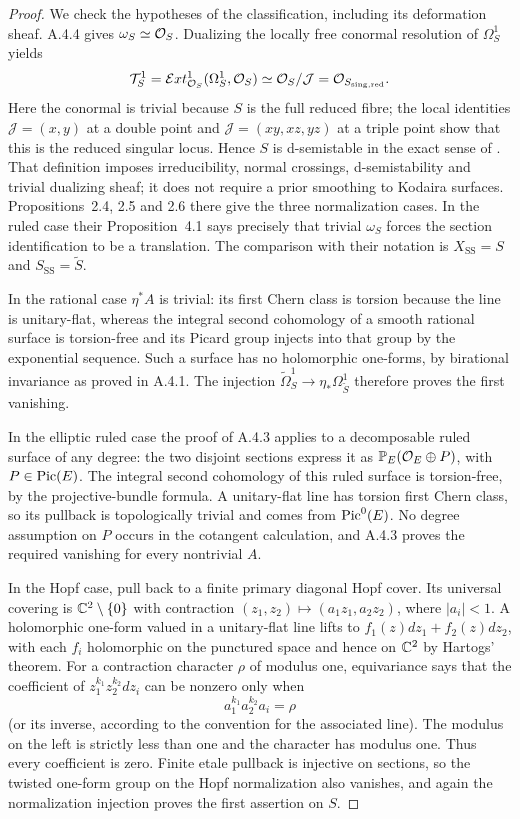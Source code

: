 \begin{proof}
We check the hypotheses of the classification, including its deformation sheaf. A.4.4 gives $\omega_S\simeq\mathcal O_S$. Dualizing the locally free conormal resolution of $\Omega_S^1$ yields
\[
 \mathcal T^1_S=\mathcal Ext^1_{\mathcal O_S}(\Omega_S^1,\mathcal O_S)
 \simeq\mathcal O_S/\mathcal J=\mathcal O_{S_{\rm sing,red}}.
\]
Here the conormal is trivial because $S$ is the full reduced fibre; the local identities $\mathcal J=(x,y)$ at a double point and $\mathcal J=(xy,xz,yz)$ at a triple point show that this is the reduced singular locus. Hence $S$ is d-semistable in the exact sense of \cite[Definition~2.1]{SS2002}. That definition imposes irreducibility, normal crossings, d-semistability and trivial dualizing sheaf; it does not require a prior smoothing to Kodaira surfaces. Propositions~2.4, 2.5 and 2.6 there give the three normalization cases. In the ruled case their Proposition~4.1 says precisely that trivial $\omega_S$ forces the section identification to be a translation. The comparison with their notation is $X_{\mathrm{SS}}=S$ and $S_{\mathrm{SS}}=\widetilde S$.

In the rational case $\eta^*A$ is trivial: its first Chern class is torsion because the line is unitary-flat, whereas the integral second cohomology of a smooth rational surface is torsion-free and its Picard group injects into that group by the exponential sequence. Such a surface has no holomorphic one-forms, by birational invariance as proved in A.4.1. The injection $\widetilde\Omega_S^1\to\eta_*\Omega^1_{\widetilde S}$ therefore proves the first vanishing.

In the elliptic ruled case the proof of A.4.3 applies to a decomposable ruled surface of any degree: the two disjoint sections express it as $\mathbb P_E(\mathcal O_E\oplus P)$, with $P\in\operatorname{Pic}(E)$. The integral second cohomology of this ruled surface is torsion-free, by the projective-bundle formula. A unitary-flat line has torsion first Chern class, so its pullback is topologically trivial and comes from $\operatorname{Pic}^0(E)$. No degree assumption on $P$ occurs in the cotangent calculation, and A.4.3 proves the required vanishing for every nontrivial $A$.

In the Hopf case, pull back to a finite primary diagonal Hopf cover. Its universal covering is $\mathbb C^2\setminus\{0\}$ with contraction $(z_1,z_2)\mapsto(a_1z_1,a_2z_2)$, where $|a_i|<1$. A holomorphic one-form valued in a unitary-flat line lifts to $f_1(z)dz_1+f_2(z)dz_2$, with each $f_i$ holomorphic on the punctured space and hence on $\mathbb C^2$ by Hartogs' theorem. For a contraction character $\rho$ of modulus one, equivariance says that the coefficient of $z_1^{k_1}z_2^{k_2}dz_i$ can be nonzero only when
\[
 a_1^{k_1}a_2^{k_2}a_i=\rho
\]
(or its inverse, according to the convention for the associated line). The modulus on the left is strictly less than one and the character has modulus one. Thus every coefficient is zero. Finite etale pullback is injective on sections, so the twisted one-form group on the Hopf normalization also vanishes, and again the normalization injection proves the first assertion on $S$.


\end{proof}
